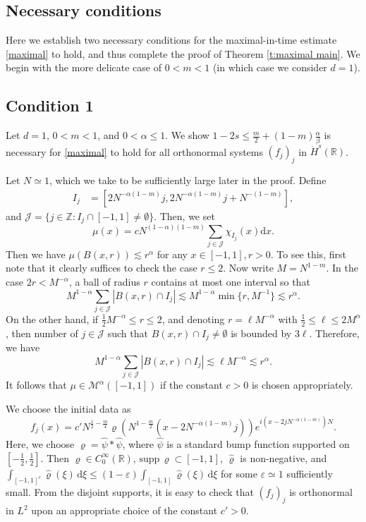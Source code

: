 \documentclass[a4paper]{amsart}
\numberwithin{equation}{section}%
\theoremstyle{plain}%
\theoremstyle{definition}
\theoremstyle{remark}%
\def\supp{\mathrm{supp\,}}
\def\d{\mathrm{d}}
\newcommand{\R}{{\mathbb R}}
\newcommand{\J}{\mathcal{J}}
\begin{document}
\subsection{Necessary conditions} \label{subsection:necssary}

Here we establish two necessary conditions for the maximal-in-time estimate \eqref{maximal} to hold, and thus complete the proof of Theorem \ref{t:maximal main}. We begin with the more delicate case of $0 < m < 1$ (in which case we consider $d = 1$).

\subsection*{Condition 1}
Let $d=1$, $0<m<1$, and $0<\alpha\leq 1$. We show $1-2s\leq\frac m2 +(1-m)\frac\alpha\beta$ is necessary for \eqref{maximal} to hold for all orthonormal systems $(f_{j})_{j}$ in $\dot{H}^s(\mathbb R)$. 

Let $N \simeq 1$, which we take to be sufficiently large later in the proof. Define 
\begin{align*}
    I_j
    &=
    [2 N^{-\alpha(1-m)}j, 2N^{-\alpha(1-m)}j+N^{-(1-m)}],
\end{align*}
and $\J=\{j\in\mathbb Z : I_j\cap [-1,1]\not=\emptyset\}$. Then, we set 
\[
    \mu(x)
    =
    c N^{(1-\alpha)(1-m)}\sum_{j\in\J}\chi_{I_j}(x)\d x.
\]
Then we have $\mu(B(x,r)) \lesssim r^\alpha$ for any $x \in [-1,1], r>0$. To see this, first note that it clearly suffices to check the case $r \leq 2$. Now write $M = N^{1-m}$. In the case $2r<M^{-\alpha}$, a ball of radius $r$ contains at most one interval so that 
\[
M^{1-\alpha} \sum_{j \in\J}| B(x,r)\cap I_{j}|
\lesssim
M^{1-\alpha}\min\{r,M^{-1}\}
\lesssim
r^\alpha.
\]
On the other hand, if $\frac12 M^{-\alpha} \leq r \leq 2$, and denoting $r = \ell M^{-\alpha}$ with $\frac12 \leq \ell \leq 2 M^\alpha$, then number of $j \in \J$ such that $B(x,r) \cap I_j \not= \emptyset$ is bounded by $3 \ell$. Therefore, we have
\[
M^{1-\alpha}\sum_{j \in \J} |B(x,r)\cap I_{j}|\lesssim \ell M^{-\alpha} \lesssim r^{\alpha}.
\]
It follows that $\mu\in\mathcal M^\alpha([-1,1])$ if the constant $c>0$ is chosen appropriately. 

We choose the initial data as
\[
    f_j(x)
    =
    c' N^{\frac12-\frac m4}\varrho(N^{1-\frac m2}(x-2N^{-\alpha(1-m)}j)) e^{i(x-2jN^{-\alpha(1-m)})N}.
\]
Here, we choose $\varrho = \widehat{\psi} * \widehat{\psi}$, where $\widehat{\psi}$ is a standard bump function supported on $[-\frac{1}{2},\frac{1}{2}]$. Then $\varrho\in C_0^\infty(\R)$, $\supp\varrho\subset[-1,1]$, $\widehat{\varrho}$ is non-negative, and $\int_{[-1,1]^c} \widehat{\varrho}(\xi) \, \mathrm{d}\xi \leq  (1 - \varepsilon) \int_{[-1,1]} \widehat{\varrho}(\xi) \, \mathrm{d}\xi$ for some $\varepsilon \simeq 1$ sufficiently small. From the disjoint supports, it is easy to check that $(f_j)_j$ is orthonormal in $L^2$ upon an appropriate choice of the constant $c' > 0$. 
\end{document}
